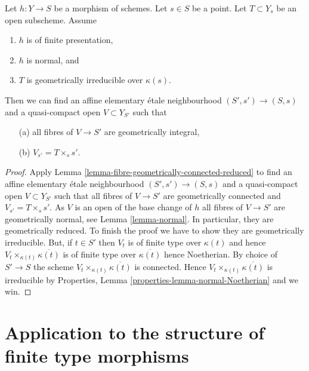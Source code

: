 \begin{lemma}
\label{lemma-normal-morphism-irreducible}
Let $h : Y \to S$ be a morphism of schemes.
Let $s \in S$ be a point.
Let $T \subset Y_s$ be an open subscheme.
Assume
\begin{enumerate}
\item $h$ is of finite presentation,
\item $h$ is normal, and
\item $T$ is geometrically irreducible over $\kappa(s)$.
\end{enumerate}
Then we can find an affine elementary \'etale neighbourhood
$(S', s') \to (S, s)$ and a quasi-compact open $V \subset Y_{S'}$ such that
\begin{enumerate}
\item[(a)] all fibres of $V \to S'$ are geometrically integral,
\item[(b)] $V_{s'} = T \times_s s'$.
\end{enumerate}
\end{lemma}

\begin{proof}
Apply
Lemma \ref{lemma-fibre-geometrically-connected-reduced}
to find an affine elementary \'etale neighbourhood $(S', s') \to (S, s)$ and
a quasi-compact open $V \subset Y_{S'}$ such that all fibres of
$V \to S'$ are geometrically connected and $V_{s'} = T \times_s s'$.
As $V$ is an open of the base change of $h$ all fibres of $V \to S'$
are geometrically normal, see Lemma \ref{lemma-normal}.
In particular, they are geometrically reduced. To finish the proof
we have to show they are geometrically irreducible. But, if $t \in S'$
then $V_t$ is of finite type over $\kappa(t)$ and hence
$V_t \times_{\kappa(t)} \overline{\kappa(t)}$ is of finite type
over $\overline{\kappa(t)}$ hence Noetherian. By choice of $S' \to S$
the scheme $V_t \times_{\kappa(t)} \overline{\kappa(t)}$ is connected.
Hence $V_t \times_{\kappa(t)} \overline{\kappa(t)}$ is irreducible by
Properties, Lemma \ref{properties-lemma-normal-Noetherian}
and we win.
\end{proof}








\section{Application to the structure of finite type morphisms}
\label{section-application-finite-type}

